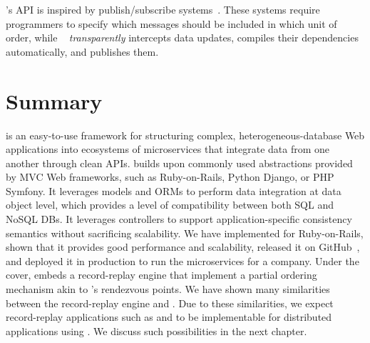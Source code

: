 \synapse's API is inspired by publish/subscribe systems~\cite{siena,scribe,thialfi,gryphon,hermes}.
These systems require programmers to specify which
messages should be included in which unit of order, while \synapse \ {\em
transparently} intercepts data updates, compiles their dependencies
automatically, and publishes them.

\section{Summary} \label{synapse:sec:conclusion}

\synapse is an easy-to-use framework for structuring complex,
heterogeneous-database Web applications into ecosystems of microservices that
integrate data from one another through clean APIs.  \synapse builds upon
commonly used abstractions provided by MVC Web frameworks, such as
Ruby-on-Rails, Python Django, or PHP Symfony. It leverages models and ORMs to
perform data integration at data object level, which provides a level of
compatibility between both SQL and NoSQL DBs. It leverages controllers to
support application-specific consistency semantics without sacrificing
scalability.  We have implemented \synapse for Ruby-on-Rails,
shown that it provides good performance and scalability, released it
on GitHub~\cite{synapse-sources}, and deployed it in production to
run the microservices for a company.
Under the cover, \synapse embeds a record-replay engine that implement a partial
ordering mechanism akin to \scribe's rendezvous points. We have shown many
similarities between the \scribe record-replay engine and \synapse.
Due to these similarities, we expect record-replay applications such as \racepro
and \dora to be implementable for distributed applications using \synapse.  We
discuss such possibilities in the next chapter.

